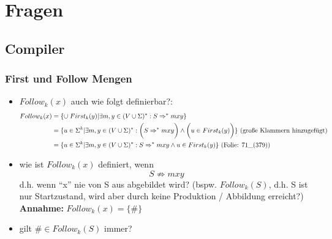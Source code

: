 \chapter{Fragen}
\section{Compiler}
\subsection{First und Follow Mengen}
\begin{itemize}
	\item $Follow_k(x)$ auch wie folgt definierbar?:
		\begin{align*}
			Follow_k(x) &= \{ \cup\; First_k(y) | \exists m,y \in (V \cup \Sigma)^* : S \Rightarrow^* mxy \}\\
						&= \{ u \in \Sigma^k | \exists m,y \in (V \cup \Sigma)^*: \bigg(S \Rightarrow^* mxy\bigg) \wedge \bigg( u \in First_k(y) \bigg) \} \text{ (große Klammern hinzugefügt)}\\
						&= \{ u \in \Sigma^k | \exists m,y \in (V \cup \Sigma)^*: S \Rightarrow^* mxy \wedge u \in First_k(y) \} \text{ (Folie: $71\_\text{(379)}$)}
		\end{align*}
	\item wie ist $Follow_k(x)$ definiert, wenn 
		$$S \nRightarrow mxy$$
		d.h. wenn \enquote{x} nie von S aus abgebildet wird? (bspw. $Follow_k(S)$, d.h. S ist nur Startzustand, wird aber durch keine Produktion / Abbildung erreicht?)\\
		\textbf{Annahme:} $Follow_k(x) = \{ \# \}$
	\item gilt $\# \in Follow_k(S)$ immer?
\end{itemize}